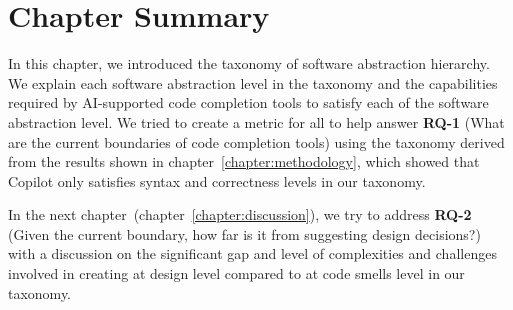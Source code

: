 \section{Chapter Summary}
In this chapter, we introduced the taxonomy of software abstraction hierarchy. We explain each software abstraction level in the taxonomy and the capabilities required by AI-supported code completion tools to satisfy each of the software abstraction level.
We tried to create a metric for all \cct{} to help answer \textbf{RQ-1} (What are the current boundaries of code completion tools) using the taxonomy derived from the results shown in chapter~\ref{chapter:methodology}, which showed that Copilot only satisfies syntax and correctness levels in our taxonomy.

In the next chapter~(chapter~\ref{chapter:discussion}), we try to address \textbf{RQ-2} (Given the current boundary, how far is it from suggesting design decisions?) with a discussion on the significant gap and level of complexities and challenges involved in creating \cct{} at design level compared to \cct{} at code smells level in our taxonomy.